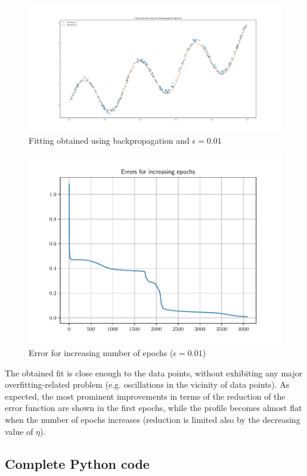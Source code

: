 \documentclass[letterpaper,headings=standardclasses]{scrartcl}
\begin{document}
\begin{figure}[h]
\centering
\includegraphics[width=\linewidth]{fit.pdf}
\caption{Fitting obtained using backpropagation and $\epsilon = 0.01$}
\label{fit}
\end{figure}

\begin{figure}[h]
\centering
\includegraphics[width=.7\linewidth]{err.pdf}
\caption{Error for increasing number of epochs ($\epsilon = 0.01$)}
\label{err}
\end{figure}

The obtained fit is close enough to the data points, without exhibiting any major overfitting-related problem (e.g. oscillations in the vicinity of data points). As expected, the most prominent improvements in terms of the reduction of the error function are shown in the first epochs, while the profile becomes almost flat when the number of epochs increases (reduction is limited also by the decreasing value of $\eta$).

\subsection{Complete Python code}


\end{document}
